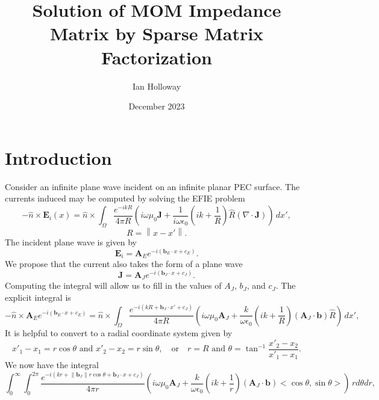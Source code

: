 \documentclass{article}
\title{Solution of MOM Impedance Matrix by Sparse Matrix Factorization}
\author{Ian Holloway}
\date{December 2023}
\newcommand{\norm}[1]{\left\lVert #1 \right\rVert}
\theoremstyle{plain}
\begin{document}
\maketitle

\section{Introduction}\label{sec_intro}

Consider an infinite plane wave incident on an infinite planar PEC surface.
The currents induced may be computed by solving the EFIE problem
\begin{equation}
	-\hat{n}\times\mathbf{E}_i(x) = \hat{n}\times\int_\Omega \frac{e^{-ikR}}{4\pi R}
	\left( i\omega\mu_0\mathbf{J} 
	+ \frac{1}{i\omega\epsilon_0}\left( ik + \frac{1}{R} \right) \hat{R} (\nabla\cdot\mathbf{J}) \right) \,dx',
\end{equation}
\begin{equation}
	R = \norm{x-x'}.
\end{equation}
The incident plane wave is given by
\begin{equation}
	\mathbf{E}_i = \mathbf{A}_Ee^{-i(\mathbf{b}_E\cdot x + c_E)}.
\end{equation}
We propose that the current also takes the form of a plane wave
\begin{equation}
	\mathbf{J} = \mathbf{A}_Je^{-i(\mathbf{b}_J\cdot x + c_J)}.
\end{equation}
Computing the integral will allow us to fill in the values of $A_J$, $b_J$, and $c_J$.
The explicit integral is
\begin{equation}
	-\hat{n}\times\mathbf{A}_Ee^{-i(\mathbf{b}_E\cdot x + c_E)}
	= \hat{n}\times\int_\Omega \frac{e^{-i(kR+\mathbf{b}_J\cdot x' + c_J)}}{4\pi R}
	\left( i\omega\mu_0 \mathbf{A}_J
	+ \frac{k}{\omega\epsilon_0}\left( ik + \frac{1}{R} \right)(\mathbf{A}_J\cdot\mathbf{b}) \hat{R} \right) \,dx',
\end{equation}
It is helpful to convert to a radial coordinate system given by
\begin{equation}
	x'_1-x_1 = r\cos{\theta} \text{ and } x'_2-x_2 = r\sin{\theta}, \quad\text{or}\quad r = R \text{ and } \theta = \tan^{-1}{\frac{x'_2 - x_2}{x'_1 - x_1}}.
\end{equation}
We now have the integral
\begin{equation}
	\int_0^\infty \int_0^{2\pi} \frac{e^{-i(kr+\norm{\mathbf{b}_J}r\cos{\theta} + \mathbf{b}_J\cdot x + c_J)}}{4\pi r}
	\left( i\omega\mu_0 \mathbf{A}_J
	+ \frac{k}{\omega\epsilon_0}\left( ik + \frac{1}{r} \right)(\mathbf{A}_J\cdot\mathbf{b}) <\cos{\theta},\sin{\theta}> \right) \,rd\theta dr,
\end{equation}
\end{document}
